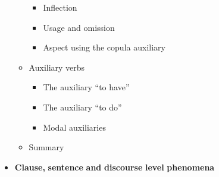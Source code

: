 \begin{itemize}
\begin{itemize}
\begin{itemize}
\item \begin{styleListParagraph}
Inflection 
\end{styleListParagraph}
\item \begin{styleListParagraph}
Usage and omission 
\end{styleListParagraph}
\item \begin{styleListParagraph}
Aspect using the copula auxiliary 
\end{styleListParagraph}
\end{itemize}
\item \begin{styleListParagraph}
Auxiliary verbs 
\end{styleListParagraph}

\begin{itemize}
\item \begin{styleListParagraph}
The auxiliary “to have” 
\end{styleListParagraph}
\item \begin{styleListParagraph}
The auxiliary “to do” 
\end{styleListParagraph}
\item \begin{styleListParagraph}
Modal auxiliaries
\end{styleListParagraph}
\end{itemize}
\item \begin{styleListParagraph}
Summary
\end{styleListParagraph}
\end{itemize}
\end{itemize}

\begin{itemize}
\item \begin{styleListParagraph}
\textbf{Clause,} \textbf{sentence} \textbf{and} \textbf{discourse} \textbf{level} \textbf{phenomena} 
\end{styleListParagraph}
\end{itemize}

